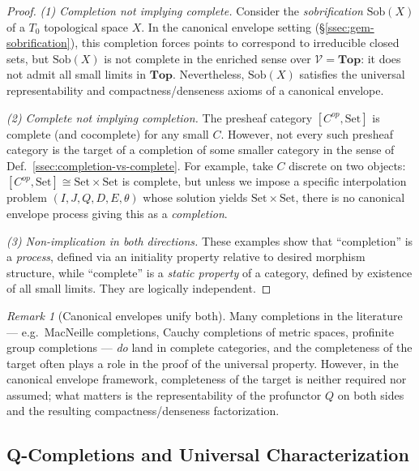 \documentclass[11pt]{article}
\theoremstyle{plain}
\theoremstyle{definition}
\theoremstyle{remark}
\newtheorem{remark}[theorem]{Remark}
\newcommand{\V}{\mathcal{V}}
\newcommand{\Set}{\mathrm{Set}}
\newcommand{\Sob}{\mathrm{Sob}}
\begin{document}
\begin{proof}
\emph{(1) Completion not implying complete.}  
Consider the \emph{sobrification} $\Sob(X)$ of a $T_0$ topological space $X$.  
In the canonical envelope setting (\S\ref{ssec:gem-sobrification}), this completion forces points to correspond to irreducible closed sets, but $\Sob(X)$ is not complete in the enriched sense over $\V=\mathbf{Top}$: it does not admit all small limits in $\mathbf{Top}$.  
Nevertheless, $\Sob(X)$ satisfies the universal representability and compactness/denseness axioms of a canonical envelope.

\emph{(2) Complete not implying completion.}  
The presheaf category $[C^{op},\Set]$ is complete (and cocomplete) for any small $C$.  
However, not every such presheaf category is the target of a completion of some smaller category in the sense of Def.~\ref{ssec:completion-vs-complete}.  
For example, take $C$ discrete on two objects: $[C^{op},\Set] \cong \Set\times\Set$ is complete, but unless we impose a specific interpolation problem $(I,J,Q,D,E,\theta)$ whose solution yields $\Set\times\Set$, there is no canonical envelope process giving this as a \emph{completion}.

\emph{(3) Non-implication in both directions.}  
These examples show that ``completion'' is a \emph{process}, defined via an initiality property relative to desired morphism structure, while ``complete'' is a \emph{static property} of a category, defined by existence of all small limits.  They are logically independent.
\end{proof}

\begin{remark}[Canonical envelopes unify both]
Many completions in the literature --- e.g.\ MacNeille completions, Cauchy completions of metric spaces, profinite group completions --- \emph{do} land in complete categories, and the completeness of the target often plays a role in the proof of the universal property.  
However, in the canonical envelope framework, completeness of the target is neither required nor assumed; what matters is the representability of the profunctor $Q$ on both sides and the resulting compactness/denseness factorization.
\end{remark}

\subsection{Q-Completions and Universal Characterization}\label{ssec:q-completions}
\end{document}

